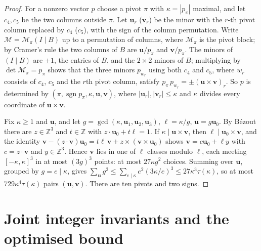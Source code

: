 \documentclass[11pt]{article}
\theoremstyle{definition}
\theoremstyle{remark}
\begin{document}
\begin{proof}
For a nonzero vector $p$ choose a pivot $\pi$ with $\kappa=|p_\pi|$ maximal, and let $c_4,c_5$ be
the two columns outside $\pi$. Let $\mathbf u_r$ ($\mathbf v_r$) be the minor with the $r$-th pivot column
replaced by $c_4$ ($c_5$), with the sign of the column permutation. Write
$\mathcal M=\mathcal M_\pi(I\mid B)$ up to a permutation of columns, where $\mathcal M_\pi$ is the
pivot block; by Cramer's rule the two columns of $B$ are $\mathbf u/p_\pi$ and $\mathbf v/p_\pi$. The minors of
$(I\mid B)$ are $\pm1$, the entries of $B$, and the $2\times2$ minors of $B$; multiplying by
$\det\mathcal M_\pi=p_\pi$ shows that the three minors $p_{w_r}$ using both $c_4$ and $c_5$, where
$w_r$ consists of $c_4$, $c_5$ and the $r$th pivot column, satisfy
$p_\pi\,p_{w_r}=\pm(\mathbf u\times \mathbf v)_r$. So $p$ is determined by
$(\pi,\operatorname{sgn}p_\pi,\kappa,\mathbf u,\mathbf v)$, where $|\mathbf u_r|,|\mathbf v_r|\le\kappa$ and $\kappa$ divides
every coordinate of $\mathbf u\times \mathbf v$.

Fix $\kappa\ge1$ and $\mathbf u$, and let $g=\gcd(\kappa,\mathbf u_1,\mathbf u_2,\mathbf u_3)$, $\ell=\kappa/g$, $\mathbf u=g\mathbf u_0$. By
B\'ezout there are $z\in\mathbb Z^3$ and $t\in\mathbb Z$ with $z\cdot \mathbf u_0+t\ell=1$. If
$\kappa\mid \mathbf u\times \mathbf v$, then $\ell\mid \mathbf u_0\times \mathbf v$, and the identity
$\mathbf v-(z\cdot \mathbf v)\mathbf u_0=t\ell\,\mathbf v+z\times(\mathbf v\times \mathbf u_0)$ shows $\mathbf v=c\mathbf u_0+\ell y$ with $c=z\cdot \mathbf v$ and
$y\in\mathbb Z^3$. Hence $\mathbf v$ lies in one of $\ell$ classes modulo $\ell$, each meeting
$[-\kappa,\kappa]^3$ in at most $(3g)^3$ points: at most $27\kappa g^2$ choices. Summing over
$\mathbf u$, grouped by $g=e\mid\kappa$, gives
$\sum_{\mathbf u} g^2\le\sum_{e\mid\kappa}e^2(3\kappa/e)^3\le27\kappa^3\tau(\kappa)$, so at most
$729\kappa^4\tau(\kappa)$ pairs $(\mathbf u,\mathbf v)$. There are ten pivots and two signs.
\end{proof}

\section{Joint integer invariants and the optimised bound}\label{sec:joint}
\end{document}
